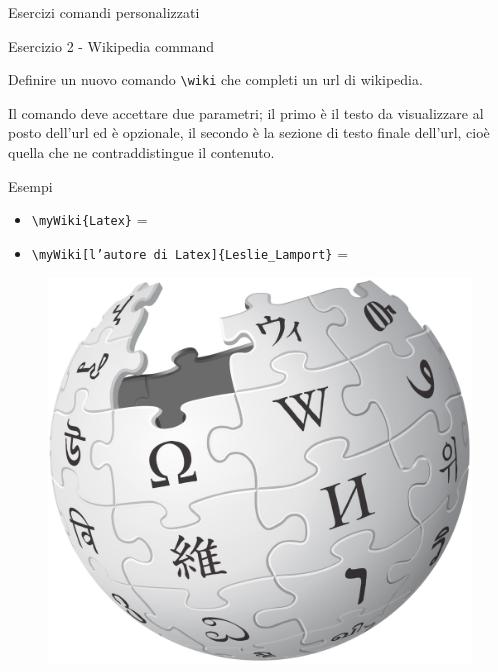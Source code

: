\begin{frame}[fragile]{Esercizi comandi personalizzati}

\begin{block}{Esercizio 2 - Wikipedia command}
    
Definire un nuovo comando \texttt{\textbackslash wiki} che completi un url di wikipedia.

Il comando deve accettare due parametri; il primo è il testo da visualizzare al posto dell'url ed è opzionale, il secondo è la sezione di testo finale dell'url, cioè quella che ne contraddistingue il contenuto.

\end{block}

\begin{block}{Esempi}

    \begin{itemize}
        \item \texttt{\textbackslash myWiki\{Latex\}} = 
        \item \texttt{\textbackslash myWiki[l'autore di Latex]\{Leslie\_Lamport\}} = 
    \end{itemize}

\end{block}

\begin{figure}[l]
    \includegraphics[scale=0.03, left]{res/images/wiki.png}
\end{figure}

\end{frame}
